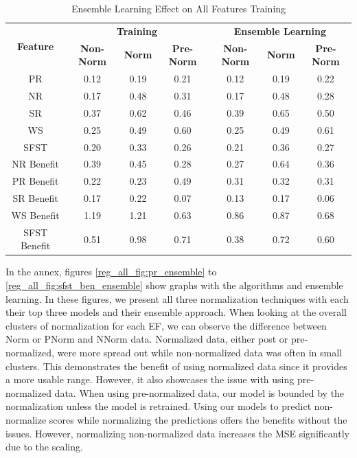\documentclass[12pt,letterpaper]{article}
\begin{document}
\begin{table}[H]
\centering
\begin{tabular}{|c||c|c|c||c|c|c|}
\hline
\multirow{2}{*}{\textbf{Feature}} & \multicolumn{3}{c||}{\textbf{Training}} & \multicolumn{3}{c|}{\textbf{Ensemble Learning}} \\
\cline{2-7}
 & \textbf{Non-Norm} & \textbf{Norm} & \textbf{Pre-Norm} & \textbf{Non-Norm} & \textbf{Norm} & \textbf{Pre-Norm} \\
\hline
PR & 0.12 & 0.19 & 0.21 & 0.12 & 0.19 & 0.22 \\
\hline
NR & 0.17 & 0.48 & 0.31 & 0.17 & 0.48 & 0.28 \\
\hline
SR & 0.37 & 0.62 & 0.46 & 0.39 & 0.65 & 0.50\\
\hline
WS & 0.25 & 0.49 & 0.60 & 0.25 & 0.49 & 0.61 \\
\hline
SFST & 0.20 & 0.33 & 0.26 & 0.21 & 0.36 & 0.27\\
\hline
NR Benefit & 0.39 & 0.45 & 0.28 & 0.27 & 0.64 & 0.36 \\
\hline
PR Benefit & 0.22 & 0.23 & 0.49 & 0.31 & 0.32 & 0.31 \\
\hline
SR Benefit & 0.17 & 0.22 & 0.07 & 0.13 & 0.17 & 0.06 \\
\hline
WS Benefit & 1.19 & 1.21 & 0.63 & 0.86 & 0.87 & 0.68 \\
\hline
SFST Benefit & 0.51 & 0.98 & 0.71 & 0.38 & 0.72 & 0.60 \\
\hline
\end{tabular}
\caption{Ensemble Learning Effect on All Features Training}
\label{reg_all_tab:ensemble}
\end{table}

In the annex, figures \ref{reg_all_fig:pr_ensemble} to \ref{reg_all_fig:sfst_ben_ensemble} show graphs with the algorithms and ensemble learning.
In these figures, we present all three normalization techniques with each their top three models and their ensemble approach.
When looking at the overall clusters of normalization for each \ac{EF}, we can observe the difference between \ac{Norm} or \ac{PNorm} and \ac{NNorm} data.
Normalized data, either post or pre-normalized, were more spread out while non-normalized data was often in small clusters.
This demonstrates the benefit of using normalized data since it provides a more usable range.
However, it also showcases the issue with using pre-normalized data.
When using pre-normalized data, our model is bounded by the normalization unless the model is retrained.
Using our models to predict non-normalize scores while normalizing the predictions offers the benefits without the issues.
However, normalizing non-normalized data increases the MSE significantly due to the scaling.
\end{document}
